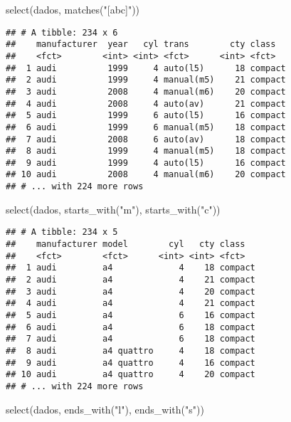 \documentclass[
]{book}
\newenvironment{Shaded}{\begin{snugshade}}{\end{snugshade}}
\newcommand{\FunctionTok}[1]{\textcolor[rgb]{0.00,0.00,0.00}{#1}}
\newcommand{\NormalTok}[1]{#1}
\newcommand{\StringTok}[1]{\textcolor[rgb]{0.31,0.60,0.02}{#1}}
\begin{document}
\begin{Shaded}
\begin{Highlighting}[]
\FunctionTok{select}\NormalTok{(dados, }\FunctionTok{matches}\NormalTok{(}\StringTok{"[abc]"}\NormalTok{))}
\end{Highlighting}
\end{Shaded}

\begin{verbatim}
## # A tibble: 234 x 6
##    manufacturer  year   cyl trans        cty class  
##    <fct>        <int> <int> <fct>      <int> <fct>  
##  1 audi          1999     4 auto(l5)      18 compact
##  2 audi          1999     4 manual(m5)    21 compact
##  3 audi          2008     4 manual(m6)    20 compact
##  4 audi          2008     4 auto(av)      21 compact
##  5 audi          1999     6 auto(l5)      16 compact
##  6 audi          1999     6 manual(m5)    18 compact
##  7 audi          2008     6 auto(av)      18 compact
##  8 audi          1999     4 manual(m5)    18 compact
##  9 audi          1999     4 auto(l5)      16 compact
## 10 audi          2008     4 manual(m6)    20 compact
## # ... with 224 more rows
\end{verbatim}

\begin{Shaded}
\begin{Highlighting}[]
\FunctionTok{select}\NormalTok{(dados, }\FunctionTok{starts\_with}\NormalTok{(}\StringTok{"m"}\NormalTok{), }\FunctionTok{starts\_with}\NormalTok{(}\StringTok{"c"}\NormalTok{)) }
\end{Highlighting}
\end{Shaded}

\begin{verbatim}
## # A tibble: 234 x 5
##    manufacturer model        cyl   cty class  
##    <fct>        <fct>      <int> <int> <fct>  
##  1 audi         a4             4    18 compact
##  2 audi         a4             4    21 compact
##  3 audi         a4             4    20 compact
##  4 audi         a4             4    21 compact
##  5 audi         a4             6    16 compact
##  6 audi         a4             6    18 compact
##  7 audi         a4             6    18 compact
##  8 audi         a4 quattro     4    18 compact
##  9 audi         a4 quattro     4    16 compact
## 10 audi         a4 quattro     4    20 compact
## # ... with 224 more rows
\end{verbatim}

\begin{Shaded}
\begin{Highlighting}[]
\FunctionTok{select}\NormalTok{(dados, }\FunctionTok{ends\_with}\NormalTok{(}\StringTok{"l"}\NormalTok{), }\FunctionTok{ends\_with}\NormalTok{(}\StringTok{"s"}\NormalTok{)) }
\end{Highlighting}
\end{Shaded}
\end{document}
